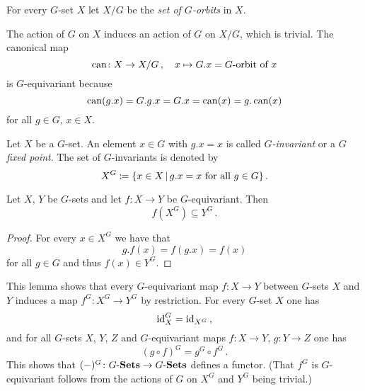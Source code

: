 \begin{definition}
  For every $G$-set $X$ let $X/G$ be the \emph{set of $G$-orbits} in $X$.
\end{definition}


\begin{note}
  The action of $G$ on $X$ induces an action of $G$ on $X/G$, which is trivial.
  The canonical map
  \[
            \operatorname{can}
    \colon  X
    \to     X/G \,,
    \quad   x
    \mapsto G.x
    =       \text{$G$-orbit of $x$}
  \]
  is $G$-equivariant because
  \[
      \operatorname{can}(g.x)
    = G.g.x
    = G.x
    = \operatorname{can}(x)
    = g.\operatorname{can}(x)
  \]
  for all $g \in G$, $x \in X$.
\end{note}


\begin{definition}
  Let $X$ be a $G$-set.
  An element $x \in G$ with $g.x = x$ is called \emph{$G$-invariant} or a \emph{$G$ fixed point}.
  The set of $G$-invariants is denoted by
  \[
              X^G
    \defined  \{
                x \in X
              \suchthat
                \text{$g.x = x$ for all $g \in G$}
              \} \,.
  \]
\end{definition}


\begin{lemma}
  Let $X$, $Y$ be $G$-sets and let $f \colon X \to Y$ be $G$-equivariant.
  Then
  \[
              f\left( X^G \right)
    \subseteq Y^G \,.
  \]
\end{lemma}
\begin{proof}
  For every $x \in X^G$ we have that
  \[
      g.f(x)
    = f(g.x)
    = f(x)
  \]
  for all $g \in G$ and thus $f(x) \in Y^G$.
\end{proof}


\begin{fluff}
  This lemma shows that every $G$-equivariant map $f \colon X \to Y$ between $G$-sets $X$ and $Y$ induces a map $f^G \colon X^G \to Y^G$ by restriction.
  For every $G$-set $X$ one has
  \[
      \operatorname{id}_X^G
    = \operatorname{id}_{X^G} \,,
  \]
  and for all $G$-sets $X$, $Y$, $Z$ and $G$-equivariant maps $f \colon X \to Y$, $g \colon Y \to Z$ one has
  \[
      (g \circ f)^G
    = g^G \circ f^G \,.
  \]
  This shows that $(-)^G \colon G\text{-}\mathbf{Sets} \to G\text{-}\mathbf{Sets}$ defines a functor.
  (That $f^G$ is $G$-equivariant follows from the actions of $G$ on $X^G$ and $Y^G$ being trivial.)
\end{fluff}


